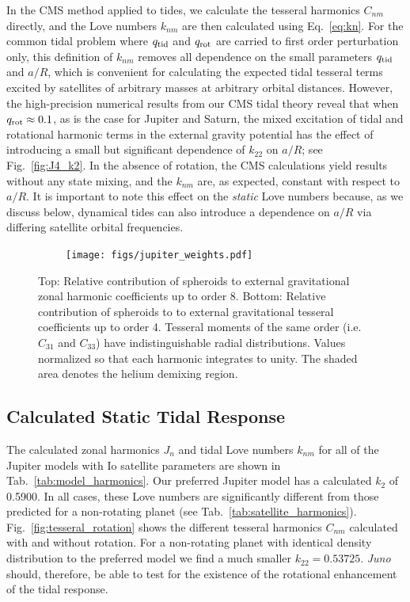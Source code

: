 In the CMS method applied to tides, we calculate the tesseral harmonics $C_{nm}$
directly, and the Love numbers $k_{nm}$ are then calculated using Eq.~\ref{eq:kn}.
For the common tidal problem where $q_{\rm tid}$ and $q_{\rm rot}$ are carried to
first order perturbation only, this definition of $k_{nm}$ removes all dependence on
the small parameters $q_{\rm tid}$ and $a/R$, which is convenient for calculating the
expected tidal tesseral terms excited by satellites of arbitrary masses at arbitrary
orbital distances.  However, the high-precision numerical results from our CMS tidal
theory reveal that when $q_{\rm rot} \approx 0.1$, as is the case for Jupiter and
Saturn, the mixed excitation of tidal and rotational harmonic terms in the external
gravity potential has the effect of introducing a small but significant dependence of
$k_{22}$ on $a/R$; see Fig.~\ref{fig:J4_k2}. In the absence of rotation, the CMS
calculations yield results without any state mixing, and the $k_{nm}$ are, as
expected, constant with respect to $a/R$.  It is important to note this effect on the
{\it static} Love numbers because, as we discuss below, dynamical tides can also
introduce a dependence on $a/R$ via differing satellite orbital frequencies.

\begin{figure}[h!]  
  \centering
    \texttt{[image: figs/jupiter\_weights.pdf]}
\caption{Top: Relative contribution of spheroids to external gravitational zonal
    harmonic coefficients up to order 8. Bottom: Relative contribution of spheroids
    to to external gravitational tesseral coefficients up to order 4. Tesseral
    moments of the same order (i.e. $C_{31}$ and $C_{33}$) have indistinguishable
radial distributions. Values normalized so that each harmonic integrates to unity.
The shaded area denotes the helium demixing region.  }
\label{fig:jupiter_weights}
\end{figure}

\subsection{Calculated Static Tidal Response}

The calculated zonal harmonics $J_n$ and tidal Love numbers $k_{nm}$ for all of the
Jupiter models with Io satellite parameters are shown in
Tab.~\ref{tab:model_harmonics}. Our preferred Jupiter model has a calculated $k_{2}$
of 0.5900. In all cases, these Love numbers are significantly different from those
predicted for a non-rotating planet (see Tab.~\ref{tab:satellite_harmonics}).
Fig.~\ref{fig:tesseral_rotation} shows the different tesseral harmonics $C_{nm}$
calculated with and without rotation. For a non-rotating planet with identical
density distribution to the preferred model we find a much smaller $k_{22}=0.53725$.
\textit{Juno} should, therefore, be able to test for the existence of the rotational
enhancement of the tidal response.


